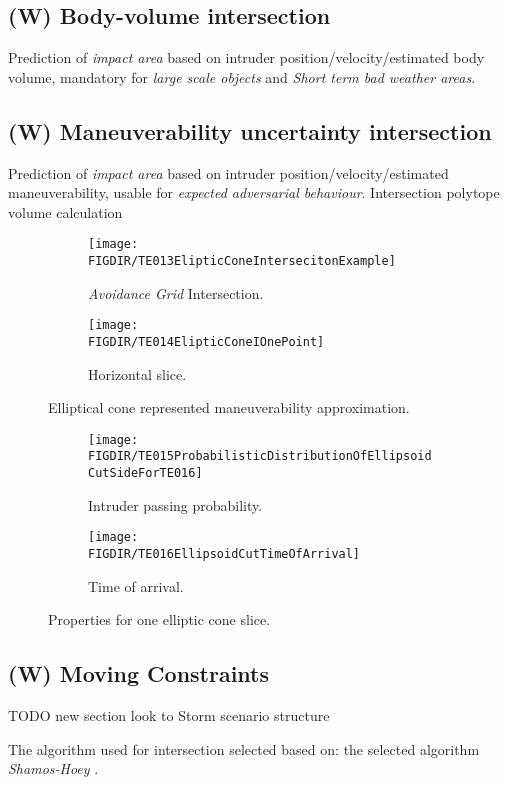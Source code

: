 \subsection{(W) Body-volume intersection}\label{s:bodyvolumeIntersection}
    \noindent Prediction of \emph{impact area} based on intruder position/velocity/estimated body volume, mandatory for \emph{large scale objects} and \emph{Short term bad weather areas}.
    
\subsection{(W) Maneuverability uncertainty intersection}\label{s:uncertaintyIntersection}
    \noindent Prediction of \emph{impact area} based on intruder position/velocity/estimated maneuverability, usable for \emph{expected adversarial behaviour}. Intersection polytope volume calculation \cite{lawrence1991polytope}
    
    \begin{figure}[H]
    	\centering
        \begin{subfigure}{0.48\textwidth}
            \texttt{[image: \\FIGDIR/TE013ElipticConeIntersecitonExample]}
            \caption{\emph{Avoidance Grid} Intersection.}
            \label{fig:ellipticConeIntersectionExample}
        \end{subfigure}
        \begin{subfigure}{0.48\textwidth}
            \texttt{[image: \\FIGDIR/TE014ElipticConeIOnePoint]} 
            \caption{Horizontal slice.}
            \label{fig:ellipticalConeHorizontalSlice}
        \end{subfigure}
        \caption{Elliptical cone represented maneuverability approximation. }
        \label{fig:ellipticalConeRepresentedManuevurabilityApproximation}
    \end{figure}
    
    \begin{figure}[H]
    	\centering
        \begin{subfigure}{0.48\textwidth}
            \texttt{[image: \\FIGDIR/TE015ProbabilisticDistributionOfEllipsoidCutSideForTE016]}
            \caption{Intruder passing probability.}
            \label{fig:intruderPassingProbability}
        \end{subfigure}
        \begin{subfigure}{0.48\textwidth}
            \texttt{[image: \\FIGDIR/TE016EllipsoidCutTimeOfArrival]} 
            \caption{Time of arrival.}
            \label{fig:intruderTimeOfArrival}
        \end{subfigure}
        \caption{Properties for one elliptic cone slice. }
        \label{fig:propertiesEllipticConeSlice}
    \end{figure}

\subsection{(W) Moving Constraints}\label{s:MovingVirtualConstraints}
TODO new section look to Storm scenario structure

The algorithm used for intersection selected based on:\citep{bentley1979algorithms} the selected algorithm  \emph{Shamos-Hoey} \cite{shamos1976geometric}.

